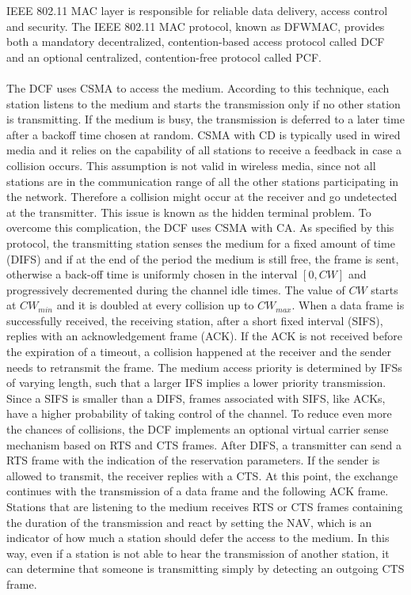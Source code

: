 IEEE 802.11 MAC layer is responsible for reliable data delivery, access control and security. The IEEE 802.11 MAC protocol, known as \gls{DFWMAC}, provides both a mandatory decentralized, contention-based access protocol called \gls{DCF} and an optional centralized, contention-free protocol called \gls{PCF}. \\\\
The \gls{DCF} uses \gls{CSMA} to access the medium. According to this technique, each station listens to the medium and starts the transmission only if no other station is transmitting. If the medium is busy, the transmission is deferred to a later time after a backoff time chosen at random. \gls{CSMA} with \gls{CD} is typically used in wired media and it relies on the capability of all stations to receive a feedback in case a collision occurs. This assumption is not valid in wireless media, since not all stations are in the communication range of all the other stations participating in the network. Therefore a collision might occur at the receiver and go undetected at the transmitter. This issue is known as the hidden terminal problem. To overcome this complication, the \gls{DCF} uses \gls{CSMA} with \gls{CA}. As specified by this protocol, the transmitting station senses the medium for a fixed amount of time (\gls{DIFS}) and if at the end of the period the medium is still free, the frame is sent, otherwise a back-off time is uniformly chosen in the interval $[0, CW]$ and progressively decremented during the channel idle times. The value of $CW$ starts at $CW_{min}$ and it is doubled at every collision up to $CW_{max}$. When a data frame is successfully received, the receiving station, after a short fixed interval (\gls{SIFS}), replies with an acknowledgement frame (ACK). If the ACK is not received before the expiration of a timeout, a collision happened at the receiver and the sender needs to retransmit the frame. The medium access priority is determined by \glspl{IFS} of varying length, such that a larger \gls{IFS} implies a lower priority transmission. Since a \gls{SIFS} is smaller than a \gls{DIFS}, frames associated with \gls{SIFS}, like ACKs, have a higher probability of taking control of the channel. To reduce even more the chances of collisions, the \gls{DCF} implements an optional virtual carrier sense mechanism based on \gls{RTS} and \gls{CTS} frames. After \gls{DIFS}, a transmitter can send a \gls{RTS} frame with the indication of the reservation parameters. If the sender is allowed to transmit, the receiver replies with a \gls{CTS}. At this point, the exchange continues with the transmission of a data frame and the following ACK frame. Stations that are listening to the medium receives \gls{RTS} or \gls{CTS} frames containing the duration of the transmission and react by setting the \gls{NAV}, which is an indicator of how much a station should defer the access to the medium. In this way, even if a station is not able to hear the transmission of another station, it can determine that someone is transmitting simply by detecting an outgoing \gls{CTS} frame. \\\\
